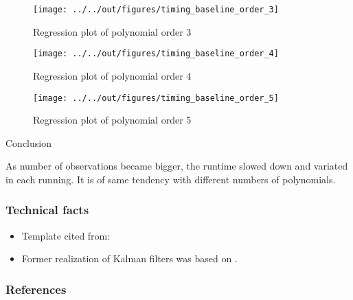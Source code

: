 \documentclass[11pt]{beamer}
\begin{document}
\begin{frame}
        \begin{figure}
    \caption{Regression plot of polynomial order 3}
    \texttt{[image: ../../out/figures/timing\_baseline\_order\_3]}
        \end{figure}
\end{frame}


\begin{frame}
        \begin{figure}
    \caption{Regression plot of polynomial order 4}
    \texttt{[image: ../../out/figures/timing\_baseline\_order\_4]}
        \end{figure}
\end{frame}


\begin{frame}
        \begin{figure}
    \caption{Regression plot of polynomial order 5}
    \texttt{[image: ../../out/figures/timing\_baseline\_order\_5]}
        \end{figure}
\end{frame}


\begin{frame}
Conclusion
\end{frame}


\begin{frame}
        As number of observations became bigger, the runtime slowed down and variated in each running. It is of same tendency with different numbers of polynomials.
\end{frame}


\begin{frame}[t]
    \frametitle{Technical facts}
    \begin{itemize}
        \item<+-> Template cited from: \citet{GaudeckerEconProjectTemplates}
        \item<+-> Former realization of Kalman filters was based on \citet{Gabler18}.
    \end{itemize}
    \note{~}
\end{frame}



\begin{frame}[allowframebreaks]
    \frametitle{References}
    
    
    
\end{frame}
\end{document}

